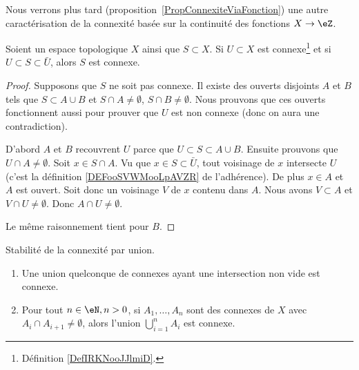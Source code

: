 Nous verrons plus tard (proposition~\ref{PropConnexiteViaFonction}) une autre caractérisation de la connexité basée sur la continuité des fonctions \( X\to \eZ\).

\begin{proposition}     \label{PROPooSCKNooRbewdv}
	Soient un espace topologique \( X\) ainsi que \( S\subset X\). Si \( U\subset X\) est connexe\footnote{Définition \ref{DefIRKNooJJlmiD}.} et si \( U\subset S\subset \bar U\), alors \( S\) est connexe.
\end{proposition}

\begin{proof}
	Supposons que \( S\) ne soit pas connexe. Il existe des ouverts disjoints \( A\) et \( B\) tels que \( S\subset A\cup B\) et \( S\cap A\neq\emptyset\), \( S\cap B\neq\emptyset\). Nous prouvons que ces ouverts fonctionnent aussi pour prouver que \( U\) est non connexe (donc on aura une contradiction).

	D'abord \( A\) et \( B\) recouvrent \( U\) parce que \( U\subset S\subset A\cup B\). Ensuite prouvons que \( U\cap A\neq \emptyset\). Soit \( x\in S\cap A\). Vu que \( x\in S\subset\bar U\), tout voisinage de \( x\) intersecte \( U\) (c'est la définition \ref{DEFooSVWMooLpAVZR} de l'adhérence). De plus \( x\in A\) et \( A\) est ouvert. Soit donc un voisinage \( V\) de \( x\) contenu dans \( A\). Nous avons \( V\subset A\) et \( V\cap U\neq \emptyset\). Donc \( A\cap U\neq \emptyset\).

	Le même raisonnement tient pour \( B\).
\end{proof}

\begin{proposition} \label{PropIWIDzzH}
	Stabilité de la connexité par union.
	\begin{enumerate}
		\item       \label{ITEMooLVSSooTGstBz}
		      Une union quelconque de connexes ayant une intersection non vide est connexe.
		\item
		      Pour tout \( n \in \eN, n > 0 \), si \( A_1,\ldots, A_n\) sont des connexes de \( X\) avec \( A_i\cap A_{i+1}\neq \emptyset\), alors l'union \( \bigcup_{i=1}^nA_i\) est connexe.
	\end{enumerate}
\end{proposition}

